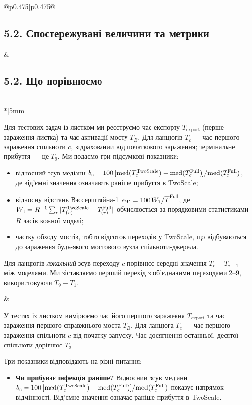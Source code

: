 \documentclass[11pt]{article}
\newcommand{\Full}{\textnormal{Full}}
\newcommand{\TS}{\textnormal{TwoScale}}
\newcommand{\eW}{e_W}
\begin{document}
\begin{longtable}{@{}p{0.475\textwidth}|p{0.475\textwidth}@{}}
\begin{minipage}[t]{\linewidth}
\subsection*{5.2. Спостережувані величини та метрики}
\end{minipage} &
\begin{minipage}[t]{\linewidth}
\subsection*{5.2. Що порівнюємо}
\end{minipage} \\*[5mm]
\begin{minipage}[t]{\linewidth}
Для тестових задач із листком ми реєструємо час експорту $T_{\mathrm{export}}$ (перше зараження листка) та час активації мосту $T_B$. Для ланцюгів $T_c$ --- час першого зараження спільноти $c$, відрахований від початкового зараження; термінальне прибуття --- це $T_9$. Ми подаємо три підсумкові показники:
\begin{itemize}
\item відносний зсув медіани $b_c=100\,[\mathrm{med}(T^{\TS}_c)-\mathrm{med}(T^{\Full}_c)]/\mathrm{med}(T^{\Full}_c)$, де від'ємні значення означають раніше прибуття в \TS{};
\item відносну відстань Вассерштайна-1 $\eW=100\,W_1/\overline{T}^{\Full}$, де $W_1=R^{-1}\sum_r|T^{\TS}_{(r)}-T^{\Full}_{(r)}|$ обчислюється за порядковими статистиками $R$ часів кожної моделі;
\item частку обходу мостів, тобто відсоток переходів у \TS{}, що відбуваються до зараження будь-якого мостового вузла спільноти-джерела.
\end{itemize}
Для ланцюгів \emph{локальний} зсув переходу $c$ порівнює середні значення $T_c-T_{c-1}$ між моделями. Ми зіставляємо перший перехід з об'єднаними переходами 2--9, використовуючи $T_9-T_1$.
\end{minipage} &
\begin{minipage}[t]{\linewidth}
У тестах із листком вимірюємо час його першого зараження $T_{\mathrm{export}}$ та час зараження першого справжнього моста $T_B$. Для ланцюга $T_c$ --- час першого зараження спільноти $c$ від початку запуску. Час досягнення останньої, десятої спільноти дорівнює $T_9$.
\par Три показники відповідають на різні питання:
\begin{itemize}
\item \textbf{Чи прибуває інфекція раніше?} Відносний зсув медіани $b_c=100\,[\mathrm{med}(T^{\TS}_c)-\mathrm{med}(T^{\Full}_c)]/\mathrm{med}(T^{\Full}_c)$ показує напрямок відмінності. Від'ємне значення означає раніше прибуття в \TS{}.

\end{itemize}
\end{minipage}
\end{longtable}
\end{document}
